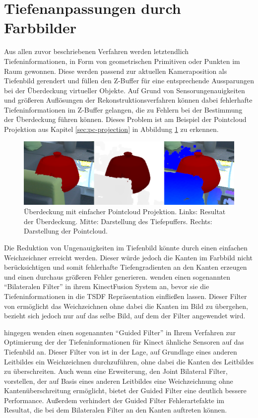 \section{Tiefenanpassungen durch Farbbilder}

Aus allen zuvor beschriebenen Verfahren werden letztendlich Tiefeninformationen, in Form von geometrischen Primitiven oder Punkten im Raum gewonnen. Diese werden passend zur aktuellen Kameraposition als Tiefenbild gerendert und füllen den Z-Buffer für eine entsprechende Aussparungen bei der Überdeckung virtueller Objekte. Auf Grund von Sensorungenauigkeiten und größeren Auflösungen der Rekonstruktionsverfahren können dabei fehlerhafte Tiefeninformationen im Z-Buffer gelangen, die zu Fehlern bei der Bestimmung der Überdeckung führen können. Dieses Problem ist am Beispiel der Pointcloud Projektion aus Kapitel \ref{sec:pc-projection} in Abbildung \ref{fig:pc-noise} zu erkennen. 

\begin{figure}[h]
  \centering
	\includegraphics[width=1.0\textwidth]{content/images/methods/pc-noise.png} 
  \caption{Überdeckung mit einfacher Pointcloud Projektion. Links: Resultat der Überdeckung. Mitte: Darstellung des Tiefepuffers. Rechts: Darstellung der Pointcloud.}
  \label{fig:pc-noise}
\end{figure}

Die Reduktion von Ungenauigkeiten im Tiefenbild könnte durch einen einfachen Weichzeichner erreicht werden. Dieser würde jedoch die Kanten im Farbbild nicht berücksichtigen und somit fehlerhafte Tiefengradienten an den Kanten erzeugen und einen durchaus größeren Fehler generieren. \citet{newcombe2011kinectfusion} wenden einen sogenannten \enquote{Bilateralen Filter} in ihrem KinectFusion System an, bevor sie die Tiefeninformationen in die TSDF Repräsentation einfließen lassen. Dieser Filter von \citet{tomasi1998bilateral} ermöglicht das Weichzeichnen ohne dabei die Kanten im Bild zu übergehen, bezieht sich jedoch nur auf das selbe Bild, auf dem der Filter angewendet wird. 

\citet{liu2012guided} hingegen wenden einen sogenannten \enquote{Guided Filter} in Ihrem Verfahren zur Optimierung der der Tiefeninformationen für Kinect ähnliche Sensoren auf das Tiefenbild an. Dieser Filter von \citet{he2010guided} ist in der Lage, auf Grundlage eines anderen Leitbildes ein Weichzeichnen durchzuführen, ohne dabei die Kanten des Leitbildes zu überschreiten. Auch wenn \citet{petschnigg2004digital} eine Erweiterung, den Joint Bilateral Filter, vorstellen, der auf Basis eines anderen Leitbildes eine Weichzeichnung ohne Kantenüberschreitung ermöglicht, bietet der Guided Filter eine deutlich bessere Performance. Außerdem verhindert der Guided Filter Fehlerartefakte im Resultat, die bei dem Bilateralen Filter an den Kanten auftreten können. \citep{he2010guided} 

